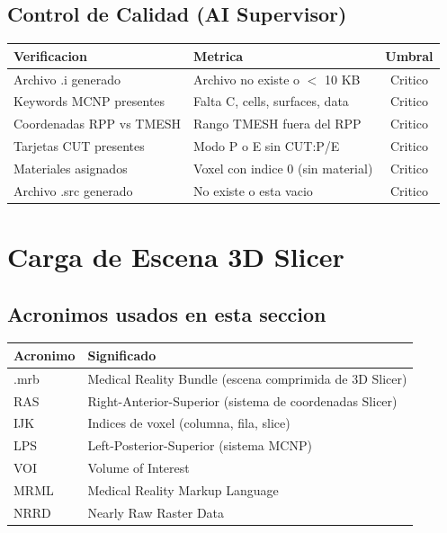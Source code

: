 \documentclass[12pt,a4paper]{article}
\begin{document}
\subsection{Control de Calidad (AI Supervisor)}

\begin{table}[H]
\centering
\begin{tabular}{llc}
\toprule
\textbf{Verificacion} & \textbf{Metrica} & \textbf{Umbral} \\
\midrule
Archivo .i generado & Archivo no existe o $<$ 10 KB & Critico \\
Keywords MCNP presentes & Falta C, cells, surfaces, data & Critico \\
Coordenadas RPP vs TMESH & Rango TMESH fuera del RPP & Critico \\
Tarjetas CUT presentes & Modo P o E sin CUT:P/E & Critico \\
Materiales asignados & Voxel con indice 0 (sin material) & Critico \\
Archivo .src generado & No existe o esta vacio & Critico \\
\bottomrule
\end{tabular}
\end{table}

\newpage

\section{Carga de Escena 3D Slicer}
\label{sec:carga}

\subsection*{Acronimos usados en esta seccion}
\begin{tabular}{ll}
\toprule
\textbf{Acronimo} & \textbf{Significado} \\
\midrule
.mrb & Medical Reality Bundle (escena comprimida de 3D Slicer) \\
RAS & Right-Anterior-Superior (sistema de coordenadas Slicer) \\
IJK & Indices de voxel (columna, fila, slice) \\
LPS & Left-Posterior-Superior (sistema MCNP) \\
VOI & Volume of Interest \\
MRML & Medical Reality Markup Language \\
NRRD & Nearly Raw Raster Data \\
\bottomrule
\end{tabular}
\end{document}
